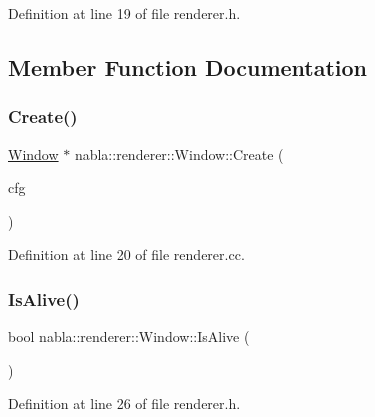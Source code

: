 Definition at line 19 of file renderer.\+h.



\subsection{Member Function Documentation}
\mbox{\label{classnabla_1_1renderer_1_1_window_acc4b55396a6ccf3d57abfc844f492323}} 
\subsubsection{\texorpdfstring{Create()}{Create()}}
{\footnotesize\ttfamily \mbox{\hyperlink{classnabla_1_1renderer_1_1_window}{Window}} $\ast$ nabla\+::renderer\+::\+Window\+::\+Create (\begin{DoxyParamCaption}\item[{const \mbox{\hyperlink{structnabla_1_1renderer_1_1_init_config}{Init\+Config}} \&}]{cfg }\end{DoxyParamCaption})\hspace{0.3cm}{\ttfamily [static]}}



Definition at line 20 of file renderer.\+cc.

\mbox{\label{classnabla_1_1renderer_1_1_window_aac292b20dba6d005eebf0da33048e005}} 
\subsubsection{\texorpdfstring{IsAlive()}{IsAlive()}}
{\footnotesize\ttfamily bool nabla\+::renderer\+::\+Window\+::\+Is\+Alive (\begin{DoxyParamCaption}{ }\end{DoxyParamCaption})\hspace{0.3cm}{\ttfamily [inline]}}



Definition at line 26 of file renderer.\+h.

\mbox{\label{classnabla_1_1renderer_1_1_window_aa1368ed98f5ebd2fd111ce0c7e400e5a}} 
